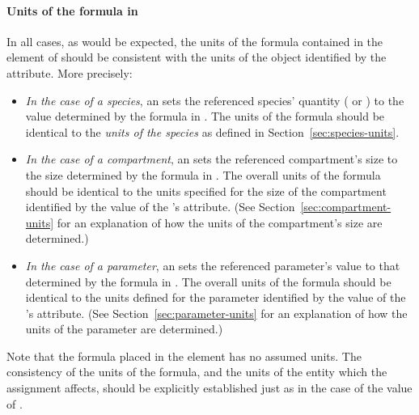 \paragraph{Units of the  formula in }

In all cases, as would be expected, the units of the formula
contained in the  element of
\EventAssignment should be consistent with the units of the object
identified by the  attribute.  More
precisely:
\begin{itemize}
  
\item \emph{In the case of a species}, an \EventAssignment sets
  the referenced species' quantity ( or
  ) to the value determined by the
  formula in .  The units of the  formula
  should be identical to the \emph{units of the species} as defined
  in Section~\ref{sec:species-units}.
  
\item \emph{In the case of a compartment}, an \EventAssignment
  sets the referenced compartment's size to the size determined by
  the formula in .  The overall units of the formula
  should be identical to the units specified for the size of the
  compartment identified by the value of the \EventAssignment's
   attribute.  (See
  Section~\ref{sec:compartment-units} for an explanation of how
  the units of the compartment's size are determined.)
  
\item \emph{In the case of a parameter}, an \EventAssignment sets
  the referenced parameter's value to that determined by the
  formula in .  The overall units of the formula should
  be identical to the units defined for the parameter identified
  by the value of the \EventAssignment's 
  attribute.  (See Section~\ref{sec:parameter-units} for
  an explanation of how the units of the parameter are
  determined.)

\end{itemize}



Note that the formula placed in the  element
has no assumed units.  The consistency of the units of the
formula, and the units of the entity which the assignment affects,
should be explicitly established just as in the case of the value of
.




